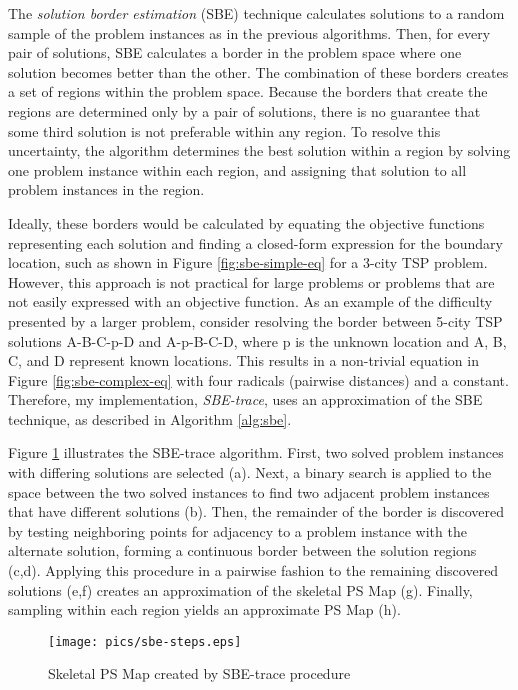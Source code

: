 The \textit{solution border estimation} (SBE) technique calculates solutions to a random sample of the problem instances as in the previous algorithms.  Then, for every pair of solutions, SBE calculates a border in the problem space where one solution becomes better than the other.  The combination of these borders creates a set of regions within the problem space.  Because the borders that create the regions are determined only by a pair of solutions, there is no guarantee that some third solution is not preferable within any region.  To resolve this uncertainty, the algorithm determines the best solution within a region by solving one problem instance within each region, and assigning that solution to all problem instances in the region.  

Ideally, these borders would be calculated by equating the objective functions representing each solution and finding a closed-form expression for the boundary location, such as shown in Figure \ref{fig:sbe-simple-eq} for a 3-city TSP problem. However, this approach is not practical for large problems or problems that are not easily expressed with an objective function.  As an example of the difficulty presented by a larger problem, consider resolving the border between 5-city TSP solutions A-B-C-p-D and A-p-B-C-D, where p is the unknown location and A, B, C, and D represent known locations.  This results in a non-trivial equation in Figure \ref{fig:sbe-complex-eq} with four radicals (pairwise distances) and a constant.  Therefore, my implementation, \textit{SBE-trace}, uses an approximation of the SBE technique, as described in Algorithm \ref{alg:sbe}.    

  Figure \ref{fig:sbe-steps} illustrates the SBE-trace algorithm.  First, two solved problem instances with differing solutions are selected (a).  Next, a binary search is applied to the space between the two solved instances to find two adjacent problem instances that have different solutions (b).  Then, the remainder of the border is discovered by testing neighboring points for adjacency to a problem instance with the alternate solution, forming a continuous border between the solution regions (c,d).  Applying this procedure in a pairwise fashion to the remaining discovered solutions (e,f) creates an approximation of the skeletal PS Map (g).  Finally, sampling within each region yields an approximate PS Map (h).


\begin{figure}
\begin{center}
    \texttt{[image: pics/sbe-steps.eps]}
    \caption{Skeletal PS Map created by SBE-trace procedure}
    \label{fig:sbe-steps}
\end{center}
\end{figure}





